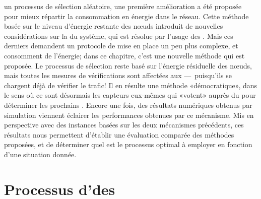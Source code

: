 \vfill
{} un processus de sélection aléatoire, une première amélioration a été proposée pour mieux répartir la consommation en énergie dans le réseau.
Cette méthode basée sur le niveau d'énergie restante des nœuds introduit de nouvelles considérations sur la \secu du système, qui est résolue par l'usage des \vns.
Mais ces derniers demandent un protocole de mise en place un peu plus complexe, et consomment de l'énergie; dans ce chapitre, c'est une nouvelle méthode qui est proposée.
\vfill
Le processus de sélection reste basé sur l'énergie résiduelle des nœuds, mais toutes les mesures de vérifications sont affectées aux \cns ---~puisqu'ils se chargent déjà de vérifier le trafic!
Il en résulte une méthode «démocratique», dans le sens où ce sont désormais les capteurs eux-mêmes qui «votent» auprès du \ch pour déterminer les prochains \cns.
Encore une fois, des résultats numériques obtenus par simulation viennent éclairer les performances obtenues par ce mécanisme.
Mis en perspective avec des instances basées sur les deux mécanismes précédents, ces résultats nous permettent d'établir une évaluation comparée des méthodes proposées, et de déterminer quel est le processus optimal à employer en fonction d'une situation donnée.
\vfill

\pagebreak %
\section{Processus d'\elecdem des \cns}\label{sd:sec:proposal}

